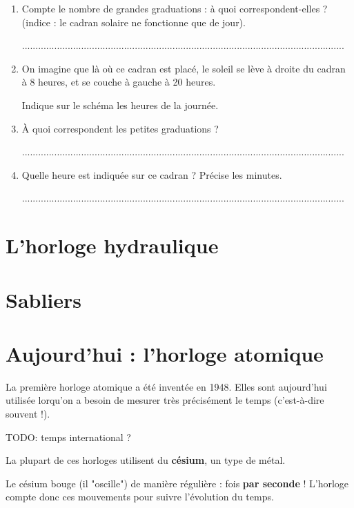 \documentclass[a4paper,11pt]{article}
\begin{document}
\begin{enumerate}
	\item Compte le nombre de grandes graduations : à quoi correspondent-elles ? (indice : le cadran solaire ne fonctionne que de jour). \vspace{0.6em}

	      ........................................................................................................................
	\item On imagine que là où ce cadran est placé, le soleil se lève à droite du cadran à 8 heures, et se couche à gauche à 20 heures.

	      Indique sur le schéma les heures de la journée.
	\item À quoi correspondent les petites graduations ? \vspace{0.6em}

	      ........................................................................................................................
	\item Quelle heure est indiquée sur ce cadran ? Précise les minutes. \vspace{0.6em}

	      ........................................................................................................................
\end{enumerate}

\section{L'horloge hydraulique}
\section{Sabliers}

\section{Aujourd'hui : l'horloge atomique}

\begin{greybox}[frametitle={Point historique}]
	La première horloge atomique a été inventée en 1948. Elles sont aujourd'hui utilisée lorqu'on a besoin de mesurer très précisément le temps (c'est-à-dire souvent !).

	TODO: temps international ?
\end{greybox}

\begin{attention}[frametitle={Comment ça fonctionne ?}]
	La plupart de ces horloges utilisent du \textbf{césium}, un type de métal.

	Le césium bouge (il "oscille") de manière régulière :  fois \textbf{par seconde} ! L'horloge compte donc ces mouvements pour suivre l'évolution du temps.
\end{attention}
\end{document}
